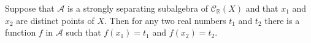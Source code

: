Suppose that $\mathcal{A}$ is a strongly separating subalgebra of $\mathcal{C}_{\mathbb{R}}(X)$ and that $x_1$ and $x_2$ are distinct points of $X$. Then for any two real numbers $t_1$ and $t_2$ there is a function $f$ in $\mathcal{A}$ such that $f(x_1) = t_1$ and $f(x_2) = t_2$.
